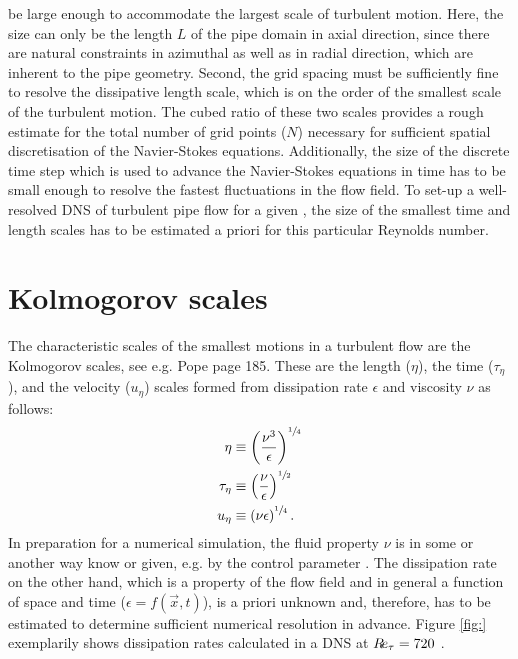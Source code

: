 \documentclass[a4paper, 11pt, twoside, DIV=12]{scrartcl}
\begin{document}
be large enough to accommodate the largest scale of turbulent motion. Here, the
size can only be the length $L$ of the pipe domain in axial direction, since
there are natural constraints in azimuthal as well as in radial direction, which
are inherent to the pipe geometry. Second, the grid spacing must be sufficiently
fine to resolve the dissipative length scale, which is on the order of the
smallest scale of the turbulent motion. The cubed ratio of these two scales
provides a rough estimate for the total number of grid points ($N$) necessary
for sufficient spatial discretisation of the Navier-Stokes equations.
Additionally, the size of the discrete time step which is used to advance the
Navier-Stokes equations in time has to be small enough to resolve the fastest
fluctuations in the flow field. To set-up a well-resolved DNS of turbulent pipe
flow for a given \Reynolds, the size of the smallest time and length scales has
to be estimated a priori for this particular Reynolds number.
%
%
%
\section{Kolmogorov scales}
The characteristic scales of the smallest motions in a turbulent flow are the
Kolmogorov scales, see e.g. Pope \cite{Pope2000} page 185. These are the length
($\eta$), the time ($\tau_{\eta}$), and the velocity ($u_{\eta}$) scales formed
from dissipation rate $\epsilon$ and viscosity $\nu$ as follows:
\begin{align}
\eta &\equiv \left(\frac{\nu^{3}}{\epsilon}\right)^{\sfrac{1}{4}}
\label{eq:kolmogorovLengthScale}\\
\tau_{\eta} &\equiv \left(\frac{\nu}{\epsilon}\right)^{\sfrac{1}{2}}
\label{eq:kolmogorovTimeScale}\\
u_{\eta} &\equiv \left(\nu\epsilon\right)^{\sfrac{1}{4}}\text{.}
\label{eq:kolmogorovVelocityScale}
\end{align}
In preparation for a numerical simulation, the fluid property $\nu$ is in some
or another way know or given, e.g. by the control parameter \Reynolds. The
dissipation rate on the other hand, which is a property of the flow field and in
general a function of space and time ($\epsilon=f(\vec{x},t)$), is a priori
unknown and, therefore, has to be estimated to determine sufficient numerical
resolution in advance. Figure \ref{fig:} exemplarily shows dissipation rates
calculated in a DNS at $R\!e_{\tau}=\num{720}$ \cite{}.
%
%
%
\end{document}
